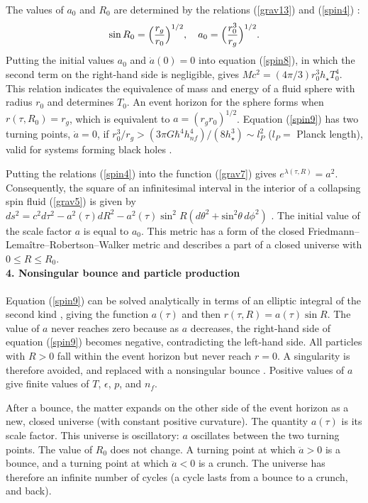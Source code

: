 \documentclass[prd,onecolumn,nofootinbib]{revtex4}
\begin{document}
The values of $a_0$ and $R_0$ are determined by the relations (\ref{grav13}) and (\ref{spin4}) \cite{LL2,collapse}:
\begin{equation}
    \sin R_0=\Bigl(\frac{r_g}{r_0}\Bigr)^{1/2},\quad a_0=\Bigl(\frac{r_0^3}{r_g}\Bigr)^{1/2}.
    \label{size}
\end{equation}
Putting the initial values $a_0$ and $\dot{a}(0)=0$ into equation (\ref{spin8}), in which the second term on the right-hand side is negligible, gives $Mc^2=(4\pi/3)r^3_0 h_\star T^4_0$.
This relation indicates the equivalence of mass and energy of a fluid sphere with radius $r_0$ and determines $T_0$.
An event horizon for the sphere forms when $r(\tau,R_0)=r_g$, which is equivalent to $a=(r_g r_0)^{1/2}$.
Equation (\ref{spin9}) has two turning points, $\dot{a}=0$, if $r^3_0/r_g>(3\pi G\hbar^4 h_{nf}^4)/(8h_\star^3)\sim l_P^2$ ($l_P=$ Planck length), valid for systems forming black holes \cite{Gabe}.

Putting the relations (\ref{spin4}) into the function (\ref{grav7}) gives $e^{\lambda(\tau,R)}=a^2$.
Consequently, the square of an infinitesimal interval in the interior of a collapsing spin fluid (\ref{grav5}) is given by $ds^2=c^2 d\tau^2-a^2(\tau)dR^2-a^2(\tau)\sin^2 R(d\theta^2+\mbox{sin}^2\theta\,d\phi^2)$ \cite{LL2}.
The initial value of the scale factor $a$ is equal to $a_0$.
This metric has a form of the closed Friedmann--Lema\^{i}tre--Robertson--Walker metric and describes a part of a closed universe with $0\le R \le R_0$.\\


{\bf 4. Nonsingular bounce and particle production}\\ \\
Equation (\ref{spin9}) can be solved analytically in terms of an elliptic integral of the second kind \cite{Gabe}, giving the function $a(\tau)$ and then $r(\tau,R)=a(\tau)\sin R$.
The value of $a$ never reaches zero because as $a$ decreases, the right-hand side of equation (\ref{spin9}) becomes negative, contradicting the left-hand side.
All particles with $R>0$ fall within the event horizon but never reach $r=0$.
A singularity is therefore avoided, and replaced with a nonsingular bounce \cite{collapse}.
Positive values of $a$ give finite values of $T$, $\epsilon$, $p$, and $n_f$.

After a bounce, the matter expands on the other side of the event horizon as a new, closed universe (with constant positive curvature).
The quantity $a(\tau)$ is its scale factor.
This universe is oscillatory: $a$ oscillates between the two turning points.
The value of $R_0$ does not change.
A turning point at which $\ddot{a}>0$ is a bounce, and a turning point at which $\ddot{a}<0$ is a crunch.
The universe has therefore an infinite number of cycles (a cycle lasts from a bounce to a crunch, and back).
\end{document}
